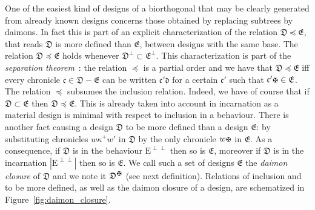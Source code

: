 \documentclass{LMCS}
\newcommand{\chronicle}[1]{{\mathfrak{#1}}}
\newcommand{\design}[1]{{\mathfrak{#1}}}
\newcommand{\designset}[1]{{\mathrm{#1}}}
\begin{document}
One of the easiest kind of designs of a biorthogonal that may be clearly generated from already known designs concerns those obtained by replacing subtrees by daimons.
In fact this is part of an explicit characterization of the relation $\design{D} \preccurlyeq \design{E}$, that reads $\design{D}$ is more defined than $\design{E}$, between designs with the same base. The relation $\design{D} \preccurlyeq \design{E}$ holds whenever $\design{D}^\perp\subset\design{E}^\perp$.
This characterization is part of the {\em separation theorem}~\cite{DBLP:journals/mscs/Girard01}:
the relation $\preccurlyeq$ is a partial order and we have that $\design{D} \preccurlyeq \design{E}$ iff every chronicle $\chronicle{c} \in \design{D} - \design{E}$ can be written $\chronicle{c}'\chronicle{d}$ for a certain $\chronicle{c}'$ such that $\chronicle{c}'\daimon\in \design{E}$.
The relation $\preccurlyeq$ subsumes the inclusion relation. Indeed, we have of course that if $\design{D}\subset\design{E}$ then $\design{D} \preccurlyeq \design{E}$. 
This is already taken into account in incarnation as a material design is minimal with respect to inclusion in a behaviour.
There is another fact causing a design $\design{D}$ to be more defined than a design $\design{E}$: by substituting chronicles $w\kappa^+w'$ in $\design{D}$ by the only chronicle $w\daimon$ in $\design{E}$. As a consequence, if $\design{D}$ is in the behaviour $\designset{E}^{\perp\perp}$ then so is $\design{E}$, moreover if $\design{D}$ is in the incarnation $|\designset{E}^{\perp\perp}|$ then so is $\design{E}$.
We call such a set of designs $\design{E}$ the {\em daimon closure} of $\design{D}$ and we note it ${\design{D}}^\daimon$ (see next definition). 
Relations of inclusion and to be more defined, as well as the daimon closure of a design, are schematized in Figure~\ref{fig:daimon_closure}.
\end{document}
